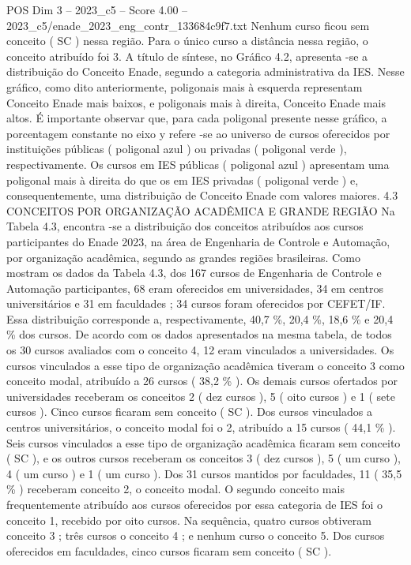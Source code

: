 \begin{textsample}{POS Dim 3 – 2023\_c5 – Score 4.00 – 2023\_c5/enade\_2023\_eng\_contr\_133684c9f7.txt}
Nenhum curso ficou sem conceito ( SC ) nessa região.
Para o único curso a distância nessa região, o conceito atribuído foi 3.
A título de síntese, no Gráfico 4.2, apresenta -se a distribuição do Conceito Enade, segundo a categoria administrativa da IES.
Nesse gráfico, como dito anteriormente, poligonais mais à esquerda representam Conceito Enade mais baixos, e poligonais mais à direita, Conceito Enade mais altos.
É importante observar que, para cada poligonal presente nesse gráfico, a porcentagem constante no eixo y refere -se ao universo de cursos oferecidos por instituições públicas ( poligonal azul ) ou privadas ( poligonal verde ), respectivamente.
Os cursos em IES públicas ( poligonal azul ) apresentam uma poligonal mais à direita do que os em IES privadas ( poligonal verde ) e, consequentemente, uma distribuição de Conceito Enade com valores maiores. 4.3 CONCEITOS POR ORGANIZAÇÃO ACADÊMICA E GRANDE REGIÃO Na Tabela 4.3, encontra -se a distribuição dos conceitos atribuídos aos cursos participantes do Enade 2023, na área de Engenharia de Controle e Automação, por organização acadêmica, segundo as grandes regiões brasileiras.
Como mostram os dados da Tabela 4.3, dos 167 cursos de Engenharia de Controle e Automação participantes, 68 eram oferecidos em universidades, 34 em centros universitários e 31 em faculdades ; 34 cursos foram oferecidos por CEFET/IF.
Essa distribuição corresponde a, respectivamente, 40,7 \%, 20,4 \%, 18,6 \% e 20,4 \% dos cursos.
De acordo com os dados apresentados na mesma tabela, de todos os 30 cursos avaliados com o conceito 4, 12 eram vinculados a universidades.
Os cursos vinculados a esse tipo de organização acadêmica tiveram o conceito 3 como conceito modal, atribuído a 26 cursos ( 38,2 \% ).
Os demais cursos ofertados por universidades receberam os conceitos 2 ( dez cursos ), 5 ( oito cursos ) e 1 ( sete cursos ).
Cinco cursos ficaram sem conceito ( SC ).
Dos cursos vinculados a centros universitários, o conceito modal foi o 2, atribuído a 15 cursos ( 44,1 \% ).
Seis cursos vinculados a esse tipo de organização acadêmica ficaram sem conceito ( SC ), e os outros cursos receberam os conceitos 3 ( dez cursos ), 5 ( um curso ), 4 ( um curso ) e 1 ( um curso ).
Dos 31 cursos mantidos por faculdades, 11 ( 35,5 \% ) receberam conceito 2, o conceito modal.
O segundo conceito mais frequentemente atribuído aos cursos oferecidos por essa categoria de IES foi o conceito 1, recebido por oito cursos.
Na sequência, quatro cursos obtiveram conceito 3 ; três cursos o conceito 4 ; e nenhum curso o conceito 5.
Dos cursos oferecidos em faculdades, cinco cursos ficaram sem conceito ( SC ).

\end{textsample}
